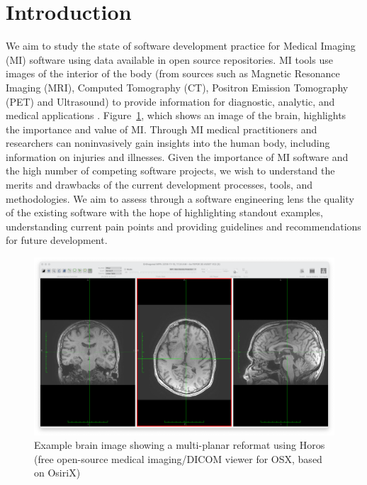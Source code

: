 \documentclass[11pt]{article}
\begin{document}
\section{Introduction} \label{ch_intro}

We aim to study the state of software development practice for Medical Imaging
(MI) software using data available in open source repositories.  MI tools use
images of the interior of the body (from sources such as Magnetic Resonance
Imaging (MRI), Computed Tomography (CT), Positron Emission Tomography (PET) and
Ultrasound) to provide information for diagnostic, analytic, and medical
applications \citep{FDA2021, enwiki:1034887445, Zhang2008}.
Figure~\ref{Fig_Example}, which shows an image of the brain, highlights the
importance and value of MI. Through MI medical practitioners and researchers can
noninvasively gain insights into the human body, including information on
injuries and illnesses. Given the importance of MI software and the high number
of competing software projects, we wish to understand the merits and drawbacks
of the current development processes, tools, and methodologies. We aim to assess
through a software engineering lens the quality of the existing software with
the hope of highlighting standout examples, understanding current pain points
and providing guidelines and recommendations for future development.

\begin{figure}[!ht]
    \begin{center}
        \includegraphics[scale=0.25]{MPR.png}        
    \end{center}
    \caption{Example brain image showing a multi-planar reformat using Horos
	(free open-source medical imaging/DICOM viewer for OSX, based on OsiriX)}
    \label{Fig_Example}
\end{figure}
    
\end{document}
